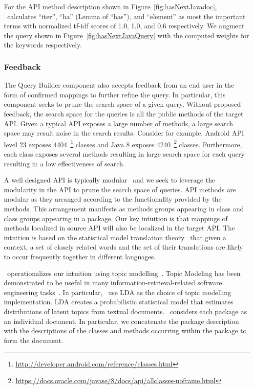 For the API method description  shown in Figure~\ref{fig:hasNextJavadoc}, \tool\ calculates ``iter'', ``ha'' (Lemma of ``has''), and ``element'' as most the important terms with normalized tf-idf scores of 1.0, 1.0, and 0,6 respectively. We augment the query shown in Figure~\ref{fig:hasNextJavaQuery} with the computed weights for the keywords respectively.

\subsubsection{Feedback}
\label{subsub:querybuilder:feedback}


The Query Builder component also accepts feedback from an end user in the form of confirmed mappings to further refine the query.
In particular, this component seeks to prune the search space of a given query.
Without proposed feedback, the search space for the queries is all the public methods of the target API.
Given a typical API exposes a large number of methods, a large search space may result noise in the search results.
Consider for example, Android API level 23 exposes 4404~\footnote{\url{http://developer.android.com/reference/classes.html}} classes
and Java 8 exposes 4240~\footnote{\url{https://docs.oracle.com/javase/8/docs/api/allclasses-noframe.html}} classes.
Furthermore, each class exposes several methods resulting in large search space for each query resulting in a low effectiveness of search.

A well designed API is typically modular~\cite{Bloch:2006:OOPSLA:APIDesign} and
we seek to leverage the modularity in the API to prune the search space of queries.
API methods are modular as they arranged according to the functionality provided by the methods. This arrangement manifests as methods groups appearing in class and class groups appearing in a package.
Our key intuition is that mappings of methods localized in source API will also be localized in the target API.
The intuition is based on the statistical model translation theory~\cite{brown1993mathematics} that given a context, a set of closely related words and the set of their translations are likely to occur frequently together in different languages. 


\tool\ operationalizes our intuition using topic modelling~\cite{blei2003latent,panichella2013effectively}.
Topic Modeling has been demonstrated to be useful in many information-retrieval-related software engineering tasks~\cite{Panichella2013:ICSE:TopicModel,Binkley:2014:ULS:2597008.2597150}.
In particular, \tool\ use LDA as the choice of topic modelling implementation. 
LDA creates a probabilistic statistical model that estimates distributions of latent topics from textual documents.
\tool\ considers each package as an individual document. 
In particular, we concatenate the package description with the descriptions of the classes and methods occurring within the package to form the document.

